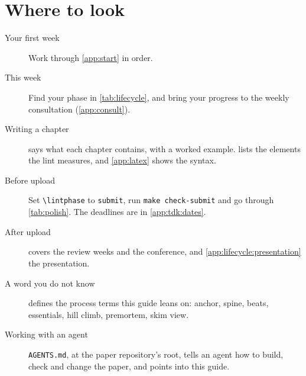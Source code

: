 \section{Where to look}\label{app:here:route}
\begin{description}
  \item[Your first week] Work through \cref{app:start} in order.
  \item[This week] Find your phase in \cref{tab:lifecycle}, and bring your progress to the weekly consultation (\cref{app:consult}).
  \item[Writing a chapter]  says what each chapter contains, with a worked example.  lists the elements the lint measures, and \cref{app:latex} shows the syntax.
  \item[Before upload] Set \texttt{\textbackslash lintphase} to \texttt{submit}, run \texttt{make check-submit} and go through \cref{tab:polish}. The deadlines are in \cref{app:tdk:dates}.
  \item[After upload]  covers the review weeks and the conference, and \cref{app:lifecycle:presentation} the presentation.
  \item[A word you do not know]  defines the process terms this guide leans on: anchor, spine, beats, essentials, hill climb, premortem, skim view.
  \item[Working with an agent] \texttt{AGENTS.md}, at the paper repository's root, tells an agent how to build, check and change the paper, and points into this guide.
\end{description}
